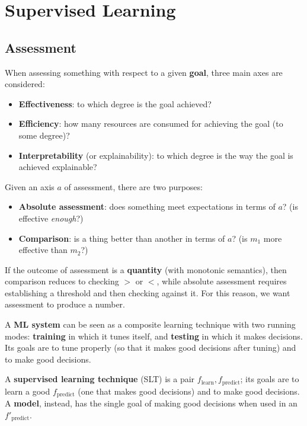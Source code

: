 
\chapter{Supervised Learning}

\section{Assessment}

When assessing something with respect to a given \textbf{goal}, three main axes are considered:
\begin{itemize}
    \item \textbf{Effectiveness}: to which degree is the goal achieved?
    \item \textbf{Efficiency}: how many resources are consumed for achieving the goal (to some degree)?
    \item \textbf{Interpretability} (or explainability): to which degree is the way the goal is achieved explainable?
\end{itemize}

\medskip

Given an axis $a$ of assessment, there are two purposes:
\begin{itemize}
    \item \textbf{Absolute assessment}: does something meet expectations in terms of $a$? (is effective \textit{enough}?)
    \item \textbf{Comparison}: is a thing better than another in terms of $a$? (is $m_1$ more effective than $m_2$?)
\end{itemize}

If the outcome of assessment is a \textbf{quantity} (with monotonic semantics), then comparison reduces to checking $>$ or $<$, while absolute assessment requires establishing a threshold and then checking against it. For this reason, we want assessment to produce a number.

\medskip

A \textbf{ML system} can be seen as a composite learning technique with two running modes: \textbf{training} in which it tunes itself, and \textbf{testing} in which it makes decisions. Its goals are to tune properly (so that it makes good decisions after tuning) and to make good decisions. 

\medskip

A \textbf{supervised learning technique} (SLT) is a pair $f_{\text{learn}}, f_{\text{predict}}$; its goals are to learn a good $f_{\text{predict}}$ (one that makes good decisions) and to make good decisions. A \textbf{model}, instead, has the single goal of making good decisions when used in an $f'_{\text{predict}}$.

